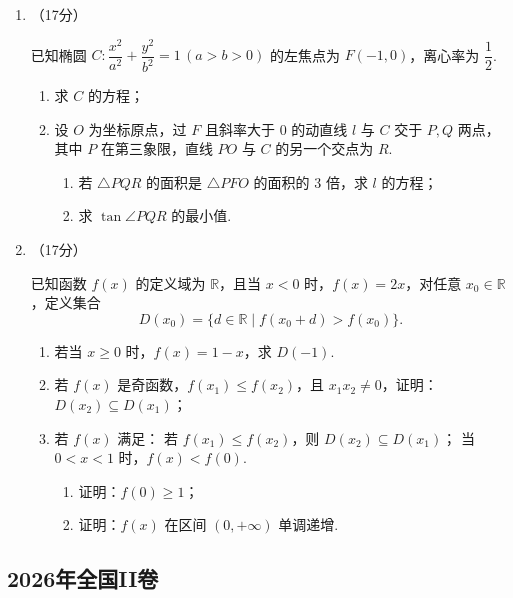 \begin{description}
\begin{enumerate}[leftmargin=5pt]
        \item （17分）

        已知椭圆 $C:\dfrac{x^2}{a^2}+\dfrac{y^2}{b^2}=1\,(a>b>0)$ 的左焦点为 $F(-1,0)$，离心率为 $\dfrac{1}{2}$. 

\begin{enumerate}[label=(\arabic*)]
            \item 求 $C$ 的方程；
            \item 设 $O$ 为坐标原点，过 $F$ 且斜率大于 $0$ 的动直线 $l$ 与 $C$ 交于 $P,Q$ 两点，其中 $P$ 在第三象限，直线 $PO$ 与 $C$ 的另一个交点为 $R$. 
            \begin{enumerate}[label=(\roman*)]
                \item 若 $\triangle PQR$ 的面积是 $\triangle PFO$ 的面积的 $3$ 倍，求 $l$ 的方程；
                \item 求 $\tan\angle PQR$ 的最小值. 
\end{enumerate}
        \end{enumerate}

        \item （17分）

        已知函数 $f(x)$ 的定义域为 $\mathbb{R}$，且当 $x<0$ 时，$f(x)=2x$，对任意 $x_0\in\mathbb{R}$，定义集合
        \[D(x_0)=\{d\in\mathbb{R}\mid f(x_0+d)>f(x_0)\}.\]

\begin{enumerate}[label=(\arabic*)]
            \item 若当 $x\geqslant 0$ 时，$f(x)=1-x$，求 $D(-1)$. 
            \item 若 $f(x)$ 是奇函数，$f(x_1)\leqslant f(x_2)$，且 $x_1x_2\neq 0$，证明：$D(x_2)\subseteq D(x_1)$；
            \item 若 $f(x)$ 满足： 若 $f(x_1)\leqslant f(x_2)$，则 $D(x_2)\subseteq D(x_1)$； 当 $0<x<1$ 时，$f(x)<f(0)$. 
            \begin{enumerate}[label=(\roman*)]
                \item 证明：$f(0)\geqslant 1$；
                \item 证明：$f(x)$ 在区间 $(0,+\infty)$ 单调递增. 
            \end{enumerate}
\end{enumerate}
    \end{enumerate}
\end{description}
\clearpage


\subsection{2026年全国II卷}\label{gk:2026年全国II卷}

